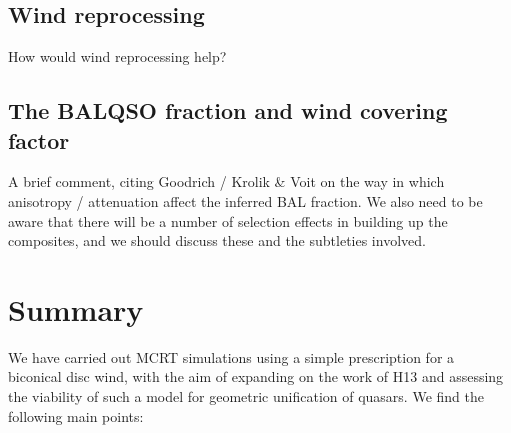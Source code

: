 \documentclass[preprint, a4paper, 11pt]{aastex}
\begin{document}
\subsection{Wind reprocessing}

How would wind reprocessing help?

\subsection{The BALQSO fraction and wind covering factor}

A brief comment, citing Goodrich / Krolik \& Voit on the 
way in which anisotropy / attenuation affect the inferred
BAL fraction. We also need to be aware that there will be a number of selection
effects in building up the composites, and we should discuss these
and the subtleties involved. 





\newpage
\section{Summary}

We have carried out MCRT simulations using a simple
prescription for a biconical disc wind, with
the aim of expanding on the work of H13 and assessing 
the viability of such a model for geometric unification of quasars.
We find the following main points:
\end{document}
